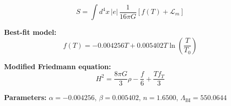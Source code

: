 
\begin{equation}
  S = \int d^4x \, |e| \, \frac{1}{16\pi G} \left[ f(T) + \mathcal{L}_m \right]
\end{equation}

\textbf{Best-fit model:}
\begin{equation}
  f(T) = -0.004256 T + 0.005402 T \ln\!\left(\frac{T}{T_0}\right)
\end{equation}

\textbf{Modified Friedmann equation:}
\begin{equation}
  H^2 = \frac{8\pi G}{3} \rho - \frac{f}{6} + \frac{T f_T}{3}
\end{equation}

\textbf{Parameters:}
$\alpha = -0.004256$, \quad
$\beta = 0.005402$, \quad
$n = 1.6500$, \quad
$\Lambda_{\text{BI}} = 550.0644$